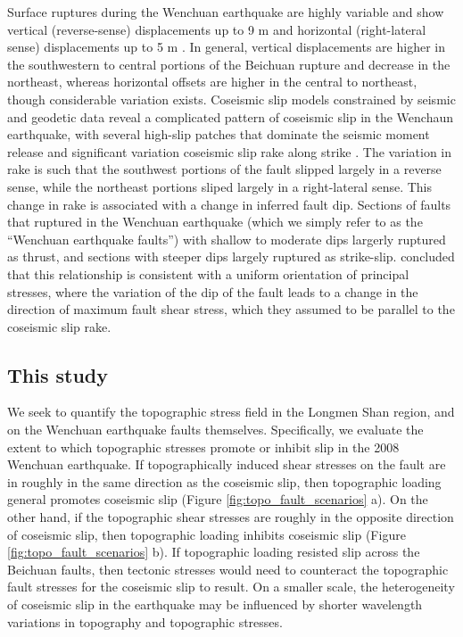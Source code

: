 \documentclass[twocolumn,jgrga]{AGUTeX}
\begin{document}
\begin{article}
Surface ruptures during the Wenchuan earthquake are highly variable and
show vertical (reverse-sense) displacements up to 9 m and horizontal
(right-lateral sense) displacements up to 5 m \citep{lin2009, liu2009,
xu2009}. In general, vertical displacements are higher in the
southwestern to central portions of the Beichuan rupture and decrease in
the northeast, whereas horizontal offsets are higher in the central to
northeast, though considerable variation exists. Coseismic slip models
constrained by seismic and geodetic data reveal a complicated pattern of
coseismic slip in the Wenchaun earthquake, with several high-slip
patches that dominate the seismic moment release and significant
variation coseismic slip rake along strike \citep[e.g.,][]{nakamura2010,
shen2009, tong2010, feng2010, zhang2011, qi2011, fielding2013}.
The variation in rake is such that the southwest portions of the fault
slipped largely in a reverse sense, while the northeast portions sliped
largely in a right-lateral sense. This change in rake is associated with
a change in inferred fault dip. Sections of faults that ruptured in the
Wenchuan earthquake (which we simply refer to as the ``Wenchuan
earthquake faults'') with shallow to moderate dips largerly ruptured as
thrust, and sections with steeper dips largely ruptured as strike-slip.
\citet{medinaluna2013} concluded that this
relationship is consistent with a uniform orientation of principal
stresses, where the variation of the dip of the fault leads to a change
in the direction of maximum fault shear stress, which they assumed to be
parallel to the coseismic slip rake.

\subsection{This study}\label{this-study}

We seek to quantify the topographic stress field in the Longmen Shan
region, and on the Wenchuan earthquake faults themselves. Specifically,
we evaluate the extent to which topographic stresses promote or inhibit
slip in the 2008 Wenchuan earthquake. If topographically induced shear
stresses on the fault are in roughly in the same direction as the
coseismic slip, then topographic loading general promotes coseismic slip
(Figure \ref{fig:topo_fault_scenarios} a). On the other hand, if the
topographic shear stresses are roughly in the opposite direction of
coseismic slip, then topographic loading inhibits coseismic slip (Figure
\ref{fig:topo_fault_scenarios} b). If topographic loading resisted slip
across the Beichuan faults, then tectonic stresses would need to
counteract the topographic fault stresses for the coseismic slip to
result. On a smaller scale, the heterogeneity of coseismic slip in the
earthquake may be influenced by shorter wavelength variations in
topography and topographic stresses.


\end{article}
\end{document}
